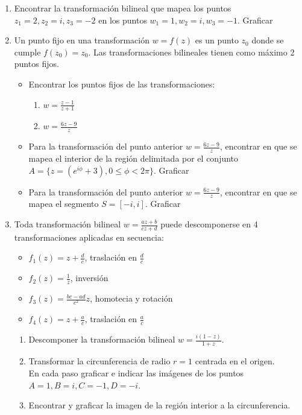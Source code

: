 \documentclass[12pt]{article}
\begin{document}
\begin{enumerate}
\item Encontrar la transformación bilineal que mapea los puntos $z_1 = 2, z_2=i, z_3 = -2$ en los puntos $w_1 = 1, w_2 = i, w_3 = -1$. Graficar
\item Un punto fijo en una transformación $w=f(z)$ es un punto $z_0$ donde se cumple $f(z_0)=z_0$.  Las transformaciones bilineales tienen como máximo 2 puntos fijos.
\begin{itemize}
\item Encontrar los puntos fijos de las transformaciones:
\begin{enumerate}
\item $w=\frac{z-1}{z+1}$
\item $w=\frac{6z-9}{z}$
\end{enumerate}
\item Para la transformación del punto anterior $w=\frac{6z-9}{z}$, encontrar en que se mapea el interior de la región delimitada por el conjunto $A=\lbrace z =(e^{i\phi} + 3), 0 \leq \phi < 2\pi \rbrace$. Graficar
\item Para la transformación del punto anterior $w=\frac{6z-9}{z}$, encontrar en que se mapea el segmento $S= [-i, i]$. Graficar
\end{itemize}
\item Toda transformación bilineal $w = \frac{az + b}{cz+ d}$ puede descomponerse en 4 transformaciones aplicadas en secuencia:
\begin{itemize}
\item $f_1(z) = z + \frac{d}{c}$, traslación en $\frac{d}{c}$
\item $f_2(z) = \frac{1}{z}$, inversión
\item $f_3(z) = \frac{bc-ad}{c^2}z$, homotecia y rotación
\item $f_4(z) = z + \frac{a}{c}$, traslación en $\frac{a}{c}$
\end{itemize}
\begin{enumerate}
\item Descomponer la transformación bilineal $w = \frac{i(1-z)}{1+z}$.
\item Transformar la circunferencia de radio $r=1$ centrada en el origen.\\
En cada paso graficar e indicar las imágenes de los puntos $A=1, B=i, C=-1, D=-i$.
\item Encontrar y graficar la imagen de la región interior a la circunferencia.
\end{enumerate}

\end{enumerate}
\end{document}
